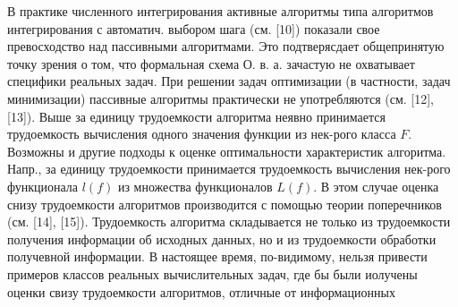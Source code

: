 \documentclass[10pt]{article}
\begin{document}
В практике численного интегрирования активные алгоритмы типа алгоритмов интегрирования с автоматич. выбором шага (см. [10]) показали свое превосходство над пассивными алгоритмами. Это подтверясдает общепринятую точку зрения о том, что формальная схема О. в. а. зачастую не охватывает специфики реальных задач. При решении задач оптимизации (в частности, задач минимизации) пассивные алгоритмы практически не употребляются (см. [12], [13]). Выше за единицу трудоемкости алгоритма неявно принимается трудоемкость вычисления одного значения функции из нек-рого класса $F$. Возможны и другие подходы к оценке оптимальности характеристик алгоритма. Напр., за единицу трудоемкости принимается трудоемкость вычисления нек-рого функционала $l(f)$ из множества функционалов $L(f)$. В этом случае оценка снизу трудоемкости алгоритмов производится с помощью теории поперечников (см. [14], [15]). Трудоемкость алгоритма складывается не только из трудоемкости получения информации об исходных данных, но и из трудоемкости обработки получевной информации. В настоящее время, по-видимому, нельзя привести примеров классов реальных вычислительных задач, где бы были иолучены оценки свизу трудоемкости алгоритмов, отличные от информационных
\end{document}
